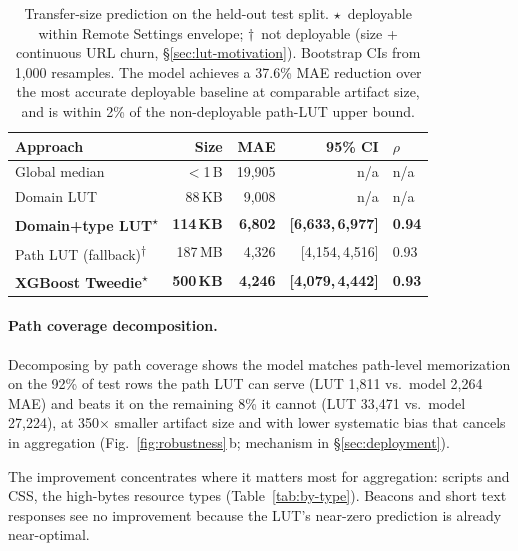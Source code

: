 \documentclass[10pt,sigconf,letterpaper,anonymous]{acmart}
\begin{document}
\begin{table}[!ht]
\centering
\small
\setlength{\tabcolsep}{4pt}
\begin{tabular}{lrrrl}
\toprule
Approach & Size & MAE & 95\% CI & $\rho$ \\
\midrule
Global median           & $<$1\,B   & 19{,}905 & n/a & n/a \\
Domain LUT              & 88\,KB    &  9{,}008 & n/a & n/a \\
\textbf{Domain+type LUT}\textsuperscript{$\star$} & \textbf{114\,KB} & \textbf{6{,}802} & \textbf{[6{,}633,\,6{,}977]} & \textbf{0.94} \\
Path LUT (fallback)\textsuperscript{$\dagger$} & 187\,MB &  4{,}326 & [4{,}154,\,4{,}516] & 0.93 \\
\textbf{XGBoost Tweedie}\textsuperscript{$\star$} & \textbf{500\,KB} & \textbf{4{,}246} & \textbf{[4{,}079,\,4{,}442]} & \textbf{0.93} \\
\bottomrule
\end{tabular}
\caption{Transfer-size prediction on the held-out test split. $\star$~deployable within Remote Settings envelope; $\dagger$~not deployable (size + continuous URL churn, \S\ref{sec:lut-motivation}). Bootstrap CIs from 1{,}000 resamples. The model achieves a 37.6\% MAE reduction over the most accurate deployable baseline at comparable artifact size, and is within 2\% of the non-deployable path-LUT upper bound.}
\label{tab:main-results}
\end{table}

\paragraph{Path coverage decomposition.}
Decomposing by path coverage shows the model matches path-level memorization on the 92\% of test rows the path LUT can serve (LUT 1{,}811 vs.\ model 2{,}264 MAE) and beats it on the remaining 8\% it cannot (LUT 33{,}471 vs.\ model 27{,}224), at 350$\times$ smaller artifact size and with lower systematic bias that cancels in aggregation (Fig.~\ref{fig:robustness}\,b; mechanism in \S\ref{sec:deployment}).

The improvement concentrates where it matters most for aggregation: scripts and CSS, the high-bytes resource types (Table~\ref{tab:by-type}).
Beacons and short text responses see no improvement because the LUT's near-zero prediction is already near-optimal.
\end{document}
